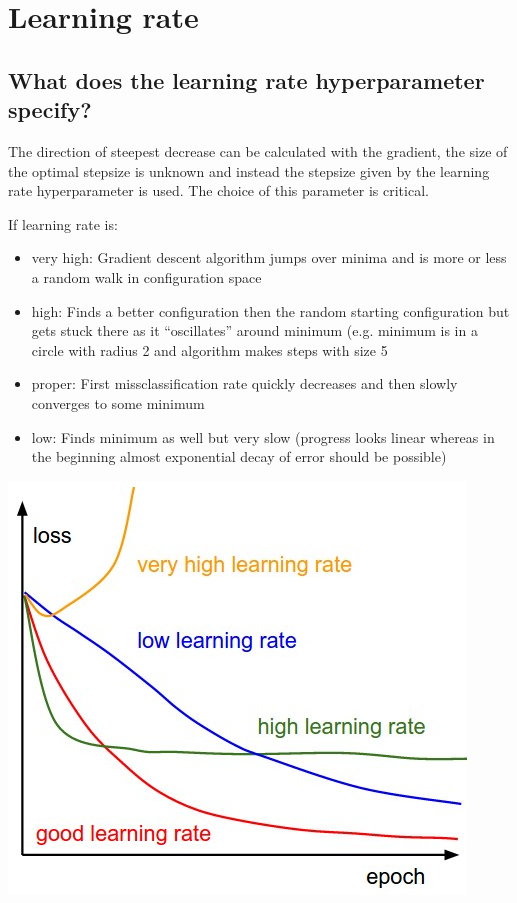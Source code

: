 \section{Learning rate}
\subsection{What does the learning rate hyperparameter specify?}
The direction of steepest decrease can be calculated with the gradient, the size of the optimal stepsize is unknown and instead the stepsize given by the learning rate hyperparameter is used. The choice of this parameter is critical. 

If learning rate is:

\begin{minipage}{0.7\textwidth}
\begin{itemize}
\item very high: Gradient descent algorithm jumps over minima and is more or less a random walk in configuration space
\item high: Finds a better configuration then the random starting configuration but gets stuck there as it ``oscillates'' around minimum (e.g. minimum is in a circle with radius 2 and algorithm makes steps with size 5

\item proper: First missclassification rate quickly decreases and then slowly converges to some minimum
\item low: Finds minimum as well but very slow (progress looks linear whereas in the beginning almost exponential decay of error should be possible)
\end{itemize}
\end{minipage}\begin{minipage}{0.3\textwidth}
\hspace{0.2cm}\includegraphics[width=\textwidth]{./img/learningrates.jpeg}
\end{minipage}
